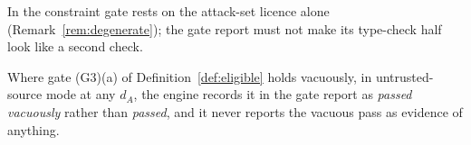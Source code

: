 
In  the constraint gate rests on the attack-set
licence alone (Remark~\ref{rem:degenerate}); the gate report must not make
its type-check half look like a second check.

\begin{requirement}\label{req:vacuous-gate-report}
Where gate (G3)(a) of Definition~\ref{def:eligible} holds vacuously, in
untrusted-source mode at any $d_A$, the engine records it in the gate report
 as \emph{passed vacuously} rather than \emph{passed}, and
it never reports the vacuous pass as evidence of anything.
\end{requirement}
